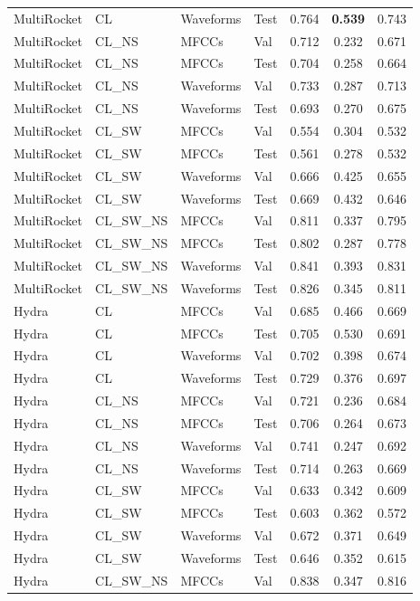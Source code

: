 \begin{longtable}{|l|l|l|l|c|c|c|}
MultiRocket & CL & Waveforms & Test & 0.764 & \textbf{0.539} & 0.743 \\
MultiRocket & CL\_NS & MFCCs & Val & 0.712 & 0.232 & 0.671 \\
MultiRocket & CL\_NS & MFCCs & Test & 0.704 & 0.258 & 0.664 \\
MultiRocket & CL\_NS & Waveforms & Val & 0.733 & 0.287 & 0.713 \\
MultiRocket & CL\_NS & Waveforms & Test & 0.693 & 0.270 & 0.675 \\
MultiRocket & CL\_SW & MFCCs & Val & 0.554 & 0.304 & 0.532 \\
MultiRocket & CL\_SW & MFCCs & Test & 0.561 & 0.278 & 0.532 \\
MultiRocket & CL\_SW & Waveforms & Val & 0.666 & 0.425 & 0.655 \\
MultiRocket & CL\_SW & Waveforms & Test & 0.669 & 0.432 & 0.646 \\
MultiRocket & CL\_SW\_NS & MFCCs & Val & 0.811 & 0.337 & 0.795 \\
MultiRocket & CL\_SW\_NS & MFCCs & Test & 0.802 & 0.287 & 0.778 \\
MultiRocket & CL\_SW\_NS & Waveforms & Val & 0.841 & 0.393 & 0.831 \\
MultiRocket & CL\_SW\_NS & Waveforms & Test & 0.826 & 0.345 & 0.811 \\
Hydra & CL & MFCCs & Val & 0.685 & 0.466 & 0.669 \\
Hydra & CL & MFCCs & Test & 0.705 & 0.530 & 0.691 \\
Hydra & CL & Waveforms & Val & 0.702 & 0.398 & 0.674 \\
Hydra & CL & Waveforms & Test & 0.729 & 0.376 & 0.697 \\
Hydra & CL\_NS & MFCCs & Val & 0.721 & 0.236 & 0.684 \\
Hydra & CL\_NS & MFCCs & Test & 0.706 & 0.264 & 0.673 \\
Hydra & CL\_NS & Waveforms & Val & 0.741 & 0.247 & 0.692 \\
Hydra & CL\_NS & Waveforms & Test & 0.714 & 0.263 & 0.669 \\
Hydra & CL\_SW & MFCCs & Val & 0.633 & 0.342 & 0.609 \\
Hydra & CL\_SW & MFCCs & Test & 0.603 & 0.362 & 0.572 \\
Hydra & CL\_SW & Waveforms & Val & 0.672 & 0.371 & 0.649 \\
Hydra & CL\_SW & Waveforms & Test & 0.646 & 0.352 & 0.615 \\
Hydra & CL\_SW\_NS & MFCCs & Val & 0.838 & 0.347 & 0.816 \\

\end{longtable}
